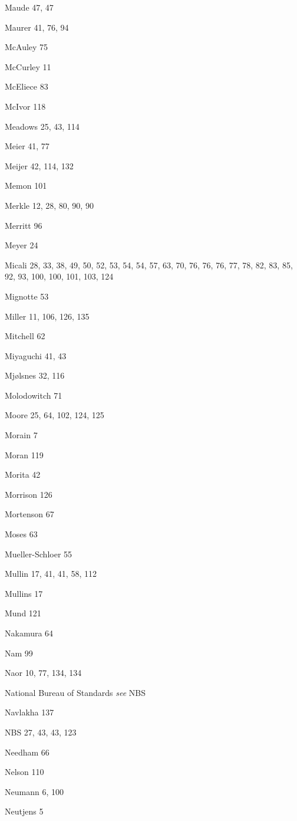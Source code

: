 \begin{theindex}
\item Maude 47, 47
\item Maurer 41, 76, 94
\item McAuley 75
\item McCurley 11
\item McEliece 83
\item McIvor 118
\item Meadows 25, 43, 114
\item Meier 41, 77
\item Meijer 42, 114, 132
\item Memon 101
\item Merkle 12, 28, 80, 90, 90
\item Merritt 96
\item Meyer 24
\item Micali 28, 33, 38, 49, 50, 52, 53, 54, 54, 57, 63, 70, 76, 76, 76, 77, 78, 82, 83, 85, 92, 93, 100, 100, 101, 103, 124
\item Mignotte 53
\item Miller 11, 106, 126, 135
\item Mitchell 62
\item Miyaguchi 41, 43
\item Mj{\o }lsnes 32, 116
\item Molodowitch 71
\item Moore 25, 64, 102, 124, 125
\item Morain 7
\item Moran 119
\item Morita 42
\item Morrison 126
\item Mortenson 67
\item Moses 63
\item Mueller-Schloer 55
\item Mullin 17, 41, 41, 58, 112
\item Mullins 17
\item Mund 121
\item Nakamura 64
\item Nam 99
\item Naor 10, 77, 134, 134
\item National Bureau of Standards {\em see\/} NBS
\item Navlakha 137
\item NBS 27, 43, 43, 123
\item Needham 66
\item Nelson 110
\item Neumann 6, 100
\item Neutjens 5

\end{theindex}
